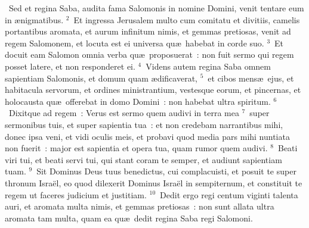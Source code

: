 ~\lettrine[lines=10,image=true,loversize=0.05,lraise=-0.03]{S}{}ed et regina Saba, audita fama Salomonis in nomine Domini, venit tentare eum in \ae nigmatibus.
${}^{2}$~Et ingressa Jerusalem multo cum comitatu et divitiis, camelis portantibus aromata, et aurum infinitum nimis, et gemmas pretiosas, venit ad regem Salomonem, et locuta est ei universa qu\ae\ habebat in corde suo.
${}^{3}$~Et docuit eam Salomon omnia verba qu\ae\ proposuerat~: non fuit sermo qui regem posset latere, et non responderet ei.
${}^{4}$~Videns autem regina Saba omnem sapientiam Salomonis, et domum quam \ae dificaverat,
${}^{5}$~et cibos mens\ae\ ejus, et habitacula servorum, et ordines ministrantium, vestesque eorum, et pincernas, et holocausta qu\ae\ offerebat in domo Domini~: non habebat ultra spiritum.
${}^{6}$~Dixitque ad regem~: Verus est sermo quem audivi in terra mea
${}^{7}$~super sermonibus tuis, et super sapientia tua~: et non credebam narrantibus mihi, donec ipsa veni, et vidi oculis meis, et probavi quod media pars mihi nuntiata non fuerit~: major est sapientia et opera tua, quam rumor quem audivi.
${}^{8}$~Beati viri tui, et beati servi tui, qui stant coram te semper, et audiunt sapientiam tuam.
${}^{9}$~Sit Dominus Deus tuus benedictus, cui complacuisti, et posuit te super thronum Isra\"el, eo quod dilexerit Dominus Isra\"el in sempiternum, et constituit te regem ut faceres judicium et justitiam.
${}^{10}$~Dedit ergo regi centum viginti talenta auri, et aromata multa nimis, et gemmas pretiosas~: non sunt allata ultra aromata tam multa, quam ea qu\ae\ dedit regina Saba regi Salomoni.


